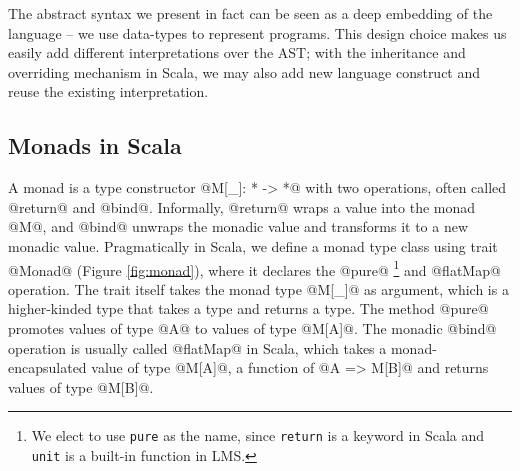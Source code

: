 The abstract syntax we present in fact can be seen as a deep embedding of the
language -- we use data-types to represent programs. This design choice makes us
easily add different interpretations over the AST; with the inheritance and
overriding mechanism in Scala, we may also add new language construct and reuse
the existing interpretation.

\iffalse
We will give the concrete semantics using a big-step definitional
interpreter. The interpreter is a recursive function that takes the program AST,
environment and store, and returns the evaluated value and the accompanied
store. The environment is a mapping from identifiers to addresses, and the store
is a mapping from addresses to values. We use the store to model recursion and
mutation in concrete semantics; it is also useful for polyvariant analysis. This
environment-and-store-passing style big-step interpreter is standard and can
also be obtained by refunctionalizing \cite{DBLP:conf/ppdp/AgerBDM03,
Wei:2018:RAA:3243631.3236800} a small-step CESK machine
\cite{DBLP:conf/popl/FelleisenF87}.
\fi

\subsection{Monads in Scala} \label{monadscala}

A monad is a type constructor @M[_]: * -> *@ with two operations, often called
@return@ and @bind@. Informally, @return@ wraps a value into the monad @M@, and
@bind@ unwraps the monadic value and transforms it to a new monadic value.
Pragmatically in Scala, we define a monad type class using trait @Monad@ (Figure
\ref{fig:monad}), where it declares the @pure@ \footnote{We elect to use
\texttt{pure} as the name, since \texttt{return} is a keyword in Scala and
\texttt{unit} is a built-in function in LMS.} and @flatMap@ operation. The trait
itself takes the monad type @M[_]@ as argument, which is a higher-kinded type
that takes a type and returns a type. The method @pure@ promotes values of type
@A@ to values of type @M[A]@. The monadic @bind@ operation is usually called
@flatMap@ in Scala, which takes a monad-encapsulated value of type @M[A]@, a
function of @A => M[B]@ and returns values of type @M[B]@.


